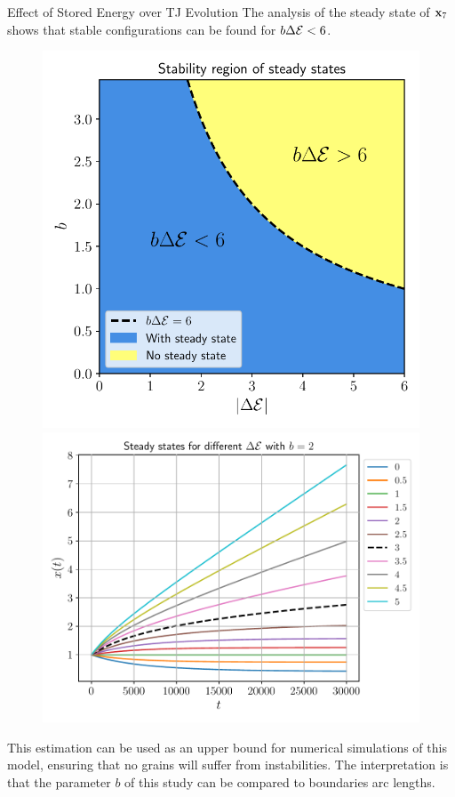 \documentclass[usenames,dvipsnames]{beamer}
\begin{document}
\begin{frame}{Effect of Stored Energy over TJ Evolution}
The analysis of the steady state of {\color{red} $\x_7$} shows that stable configurations can be found for $b\Delta \mathcal{E} < 6$.
\begin{figure}
\includegraphics[scale=0.38,valign=t, trim={0 0 0 1em}]{figures/stored_energy/SE_stability.pdf}\hfill
\includegraphics[trim={1em 1em 1em 1em}, clip=true,scale=0.38,valign=t]{figures/stored_energy/SE_experiments.pdf}
\end{figure}
This estimation can be used as an upper bound for numerical simulations of this model, ensuring that no grains will suffer from instabilities. 
The interpretation is that the parameter $b$ of this study can be compared to boundaries arc lengths.
\end{frame}
\end{document}
